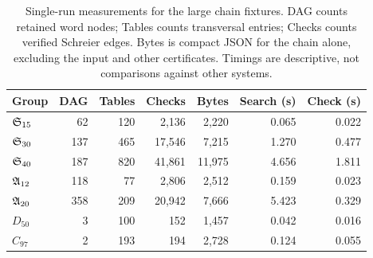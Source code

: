 \begin{table}[htbp]
\centering
\small
\begin{tabular}{@{}lrrrrrr@{}}
\toprule
Group & DAG & Tables & Checks & Bytes & Search (s) & Check (s)\\
\midrule
$\mathfrak S_{15}$ & 62 & 120 & 2,136 & 2,220 & 0.065 & 0.022\\
$\mathfrak S_{30}$ & 137 & 465 & 17,546 & 7,215 & 1.270 & 0.477\\
$\mathfrak S_{40}$ & 187 & 820 & 41,861 & 11,975 & 4.656 & 1.811\\
$\mathfrak A_{12}$ & 118 & 77 & 2,806 & 2,512 & 0.159 & 0.023\\
$\mathfrak A_{20}$ & 358 & 209 & 20,942 & 7,666 & 5.423 & 0.329\\
$D_{50}$ & 3 & 100 & 152 & 1,457 & 0.042 & 0.016\\
$C_{97}$ & 2 & 193 & 194 & 2,728 & 0.124 & 0.055\\
\bottomrule
\end{tabular}
\caption{Single-run measurements for the large chain fixtures. DAG counts retained word nodes; Tables counts transversal entries; Checks counts verified Schreier edges. Bytes is compact JSON for the chain alone, excluding the input and other certificates. Timings are descriptive, not comparisons against other systems.}
\end{table}
